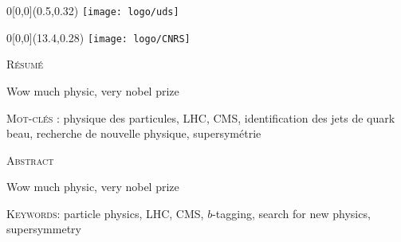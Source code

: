 \begin{textblock}{0}[0,0](0.5,0.32)
{
    \setlength{\fboxsep}{0.7pt}
    \setlength{\fboxrule}{1pt}
    \texttt{[image: logo/uds]}
}
\end{textblock}
\begin{textblock}{0}[0,0](13.4,0.28)
{
    \setlength{\fboxsep}{0.7pt}
    \setlength{\fboxrule}{1pt}
    \texttt{[image: logo/CNRS]}
}
\end{textblock}
\small
\begin{framed}
    \vspace*{-0.7cm}
\begin{center}\textsc{Résumé}\end{center}
    \vspace*{-0.4cm}
    Wow much physic, very nobel prize

    \textsc{Mot-clés} : physique des particules, LHC, CMS, identification des
    jets de quark beau, recherche de nouvelle physique, supersymétrie
\end{framed}
\vspace*{-0.2cm}
\begin{framed}
    \vspace*{-0.7cm}
\begin{center}\textsc{Abstract}\end{center}
    \vspace*{-0.4cm}
    Wow much physic, very nobel prize

    \textsc{Keywords}: particle physics, LHC, CMS, $b$-tagging, search for new
    physics, supersymmetry
\end{framed}
